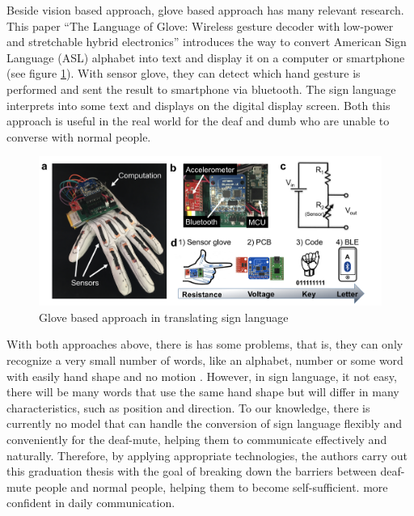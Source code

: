   Beside vision based approach, glove based approach has many relevant research. This paper “The Language of Glove: Wireless gesture
  decoder with low-power and stretchable hybrid electronics” introduces the way to convert American
  Sign Language (ASL) alphabet into text and display it on a computer 
  or smartphone (see figure \ref{fig:Chap2-Glove-Base}). With sensor glove, they can detect which hand gesture is
  performed and sent the result to smartphone via bluetooth. The sign language
  interprets into some text and displays on the digital display screen.
  Both this approach is useful in the real world for the deaf and dumb 
  who are unable to converse with normal people.

  \begin{figure}[H]
    \centering
    \includegraphics[width=\textwidth]{img/Chap2/Glove-Based.png}
    \caption{Glove based approach in translating sign language}
    \label{fig:Chap2-Glove-Base}
  \end{figure}

  With both approaches above, there is has some problems, that is, they can only recognize 
  a very small number of words, like an alphabet, number or some word with easily hand shape and no motion .
  However, in sign language, it not easy, there will be many words 
  that use the same hand shape but will differ in many characteristics, such as position 
  and direction. To our knowledge, there is currently no model that can handle the 
  conversion of sign language flexibly and conveniently for the deaf-mute, helping them 
  to communicate effectively and naturally. Therefore, by applying appropriate 
  technologies, the authors carry out this graduation thesis with the goal of breaking down 
  the barriers between deaf-mute people and normal people, helping them to become self-sufficient. 
  more confident in daily communication.


